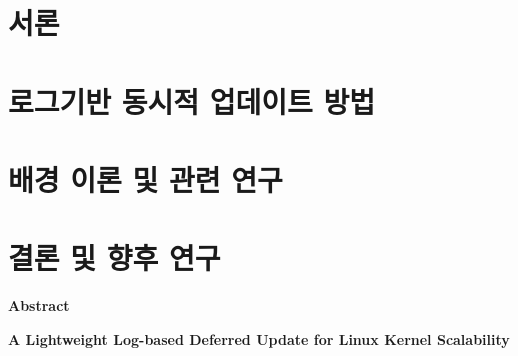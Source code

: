 \documentclass[doctor,korean,final]{kmu}
\begin{document}




\newif\ifkor
\kortrue 

\tableofcontents
\listoffigures


\newpage

\chapter{서론}


\chapter{로그기반 동시적 업데이트 방법}



\chapter{배경 이론 및 관련 연구}\label{sec:related}

\chapter{결론 및 향후 연구}\label{sec:concl}


%

%



\newpage

\hfill \break

\noindent
\Large{\textbf{Abstract}}

\noindent
\Large{\textbf{A Lightweight Log-based Deferred Update for Linux Kernel
Scalability}}
\end{document}
